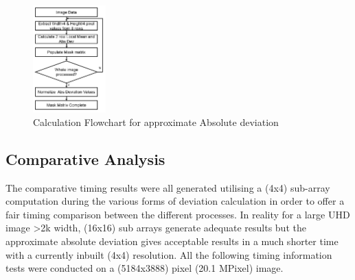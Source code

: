 \documentclass[journal]{IEEEtran}
\begin{document}
\begin{figure}[htbp]
  \centering
    \includegraphics[width=0.25\textwidth]{AppxAbsDevFlow.jpg}
   \caption{Calculation Flowchart for approximate Absolute deviation}
   \label{fig:APXADFlow}
\end{figure}

\subsection{Comparative Analysis} 
The comparative timing results were all generated utilising a (4x4) sub-array computation during the various forms of deviation calculation in order to offer a fair timing comparison between the different processes. In reality for a large UHD image \textgreater 2k width, (16x16) sub arrays generate adequate results but the approximate absolute deviation gives acceptable results in a much shorter time with a currently inbuilt (4x4) resolution. All the following timing information tests were conducted on a (5184x3888) pixel (20.1 MPixel) image.
\end{document}
